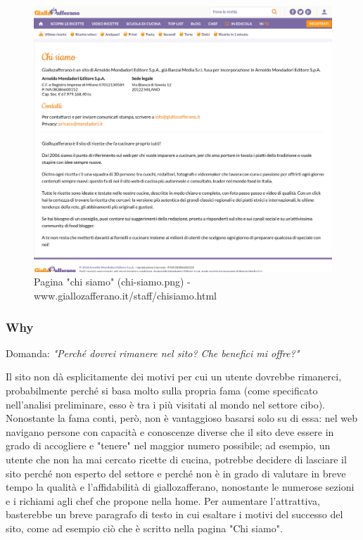 \begin{figure}[h!]
	\centerline{
	\includegraphics[scale=0.25]{images/chi-siamo.png}}
	\caption{Pagina "chi siamo" (chi-siamo.png) \newline- www.giallozafferano.it/staff/chisiamo.html}
\end{figure}

\newpage

\subsubsection{Why} 

Domanda: \textit{"Perché dovrei rimanere nel sito? Che benefici mi offre?"}

Il sito non dà esplicitamente dei motivi per cui un utente dovrebbe rimanerci, probabilmente perché si basa molto sulla propria fama (come specificato nell'analisi preliminare, esso è tra i più visitati al mondo nel settore cibo). Nonostante la fama conti, però, non è vantaggioso basarsi solo su di essa: nel web navigano persone con capacità e conoscenze diverse che il sito deve essere in grado di accogliere e "tenere" nel maggior numero possibile; ad esempio, un utente che non ha mai cercato ricette di cucina, potrebbe decidere di lasciare il sito perché non esperto del settore e perché non è in grado di valutare in breve tempo la qualità e l'affidabilità di giallozafferano, nonostante le numerose sezioni e i richiami agli chef che propone nella home. Per aumentare l'attrattiva, basterebbe un breve paragrafo di testo in cui esaltare i motivi del successo del sito, come ad esempio ciò che è scritto nella pagina "Chi siamo".

